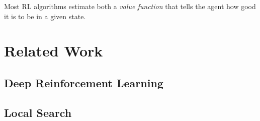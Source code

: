 Most RL algorithms estimate both a \textit{value function} that tells the agent how good it is to be in a given state.


\section{Related Work}

\subsection{Deep Reinforcement Learning}


\subsection{Local Search}








%


